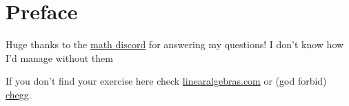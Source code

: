 \documentclass[titlepage,12pt]{book}
\begin{document}
\maketitle
\frontmatter

\chapter*{Preface}
Huge thanks to the \href{https://discord.com/invite/math}{math discord} for answering my questions! I don't know how I'd manage without them \heart
\par

If you don't find your exercise here check \href{https://linearalgebras.com/solution-understanding-analysis.html}{linearalgebras.com} or (god forbid) \href{https://www.chegg.com/homework-help/understanding-analysis-2nd-edition-solutions-9781493927111}{chegg}.
\par

\tableofcontents
\mainmatter









\end{document}
